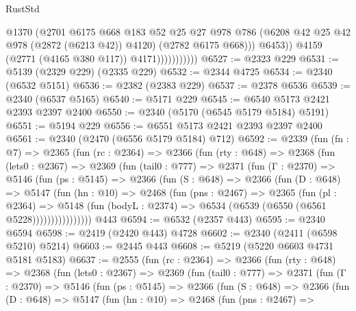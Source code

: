 \begin{lexlean}{RustStd}
\begin{coremodule}
                                @1370
                                (@2701
                                  @6175
                                  @668
                                  @183
                                  @52
                                  @25
                                  @27
                                  @978
                                  @786
                                  (@6208 @42 @25 @42 @978 (@2872 (@6213 @42)) @4120)
                                  (@2782 @6175 @668)))
                              @6453))
                          @4159
                          (@2771 (@4165 @380 @117))
                          @4171)))))))))))
@6527 := @2323 @229
@6531 := @5139 (@2329 @229) (@2335 @229)
@6532 := @2344 @4725
@6534 := @2340 (@6532 @5151)
@6536 := @2382 (@2383 @229)
@6537 := @2378 @6536
@6539 := @2340 (@6537 @5165)
@6540 := @5171 @229
@6545 := @6540 @5173 @2421 @2393 @2397 @2400
@6550 := @2340 (@5170 (@6545 @5179 @5184) @5191)
@6551 := @5194 @229
@6556 := @6551 @5173 @2421 @2393 @2397 @2400
@6561 := @2340 (@2470 (@6556 @5179 @5184) @712)
@6592 := @2339
    (fun (fn : @7) =>
    @2365
      (fun (rc : @2364) =>
      @2366
        (fun (rty : @648) =>
        @2368
          (fun (lets0 : @2367) =>
          @2369
            (fun (tail0 : @777) =>
            @2371
              (fun (Γ : @2370) =>
              @5146
                (fun (ps : @5145) =>
                @2366
                  (fun (S : @648) =>
                  @2366
                    (fun (D : @648) =>
                    @5147
                      (fun (hn : @10) =>
                      @2468
                        (fun (pns : @2467) =>
                        @2365
                          (fun (pl : @2364) =>
                          @5148
                            (fun (bodyL : @2374) => @6534 (@6539 (@6550 (@6561 @5228))))))))))))))))
    @443
@6594 := @6532 (@2357 @443)
@6595 := @2340 @6594
@6598 := @2419 (@2420 @443) @4728
@6602 := @2340 (@2411 (@6598 @5210) @5214)
@6603 := @2445 @443
@6608 := @5219 (@5220 @6603 @4731 @5181 @5183)
@6637 := @2555
    (fun (rc : @2364) =>
    @2366
      (fun (rty : @648) =>
      @2368
        (fun (lets0 : @2367) =>
        @2369
          (fun (tail0 : @777) =>
          @2371
            (fun (Γ : @2370) =>
            @5146
              (fun (ps : @5145) =>
              @2366
                (fun (S : @648) =>
                @2366
                  (fun (D : @648) =>
                  @5147
                    (fun (hn : @10) =>
                    @2468
                      (fun (pns : @2467) =>

\end{coremodule}
\end{lexlean}
